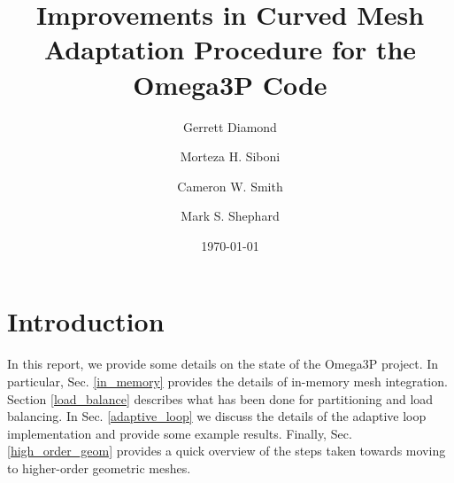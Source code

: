 \documentclass[review,12pt]{elsarticle_summary_report}
\begin{document}
\title{Improvements in Curved Mesh Adaptation Procedure for the Omega3P Code}%


\author[inst1]{Gerrett Diamond}
\author[inst1]{Morteza H. Siboni}
\author[inst1]{Cameron W. Smith}


\author[inst1]{Mark S. Shephard }
\address[inst1]{Scientific Computing Research Center, Rensselaer Polytechnic Institute,\\ Troy, NY 12180}


\date{\today}





\maketitle




\section{Introduction}
In this report, we provide some details on the state of the Omega3P project.
In particular, Sec. \ref{in_memory} provides the details of in-memory mesh integration.
Section \ref{load_balance} describes what has been done for partitioning and load balancing.
In Sec. \ref{adaptive_loop} we discuss the details of the adaptive loop implementation and provide some example results.
Finally, Sec. \ref{high_order_geom} provides a quick overview of the steps taken towards moving to higher-order geometric meshes.


\end{document}
